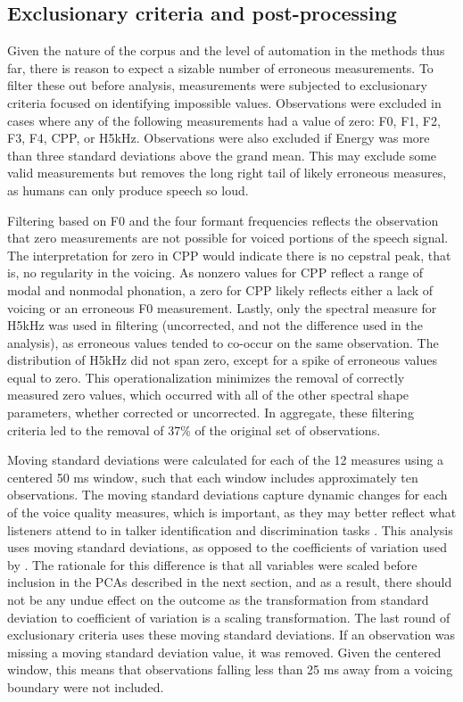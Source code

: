 \subsection{Exclusionary criteria and post-processing}\label{ch3:sec:exclusions}

Given the nature of the corpus and the level of automation in the methods thus far, there is reason to expect a sizable number of erroneous measurements. To filter these out before analysis, measurements were subjected to exclusionary criteria focused on identifying impossible values. Observations were excluded in cases where any of the following measurements had a value of zero: F0, F1, F2, F3, F4, CPP, or H5kHz. Observations were also excluded if Energy was more than three standard deviations above the grand mean. This may exclude some valid measurements but removes the long right tail of likely erroneous measures, as humans can only produce speech so loud. 

Filtering based on F0 and the four formant frequencies reflects the observation that zero measurements are not possible for voiced portions of the speech signal. The interpretation for zero in CPP would indicate there is no cepstral peak, that is, no regularity in the voicing. As nonzero values for CPP reflect a range of modal and nonmodal phonation, a zero for CPP likely reflects either a lack of voicing or an erroneous F0 measurement. Lastly, only the spectral measure for H5kHz was used in filtering (uncorrected, and not the difference used in the analysis), as erroneous values tended to co-occur on the same observation. The distribution of H5kHz did not span zero, except for a spike of erroneous values equal to zero. This operationalization minimizes the removal of correctly measured zero values, which occurred with all of the other spectral shape parameters, whether corrected or uncorrected. In aggregate, these filtering criteria led to the removal of 37\% of the original set of observations.

Moving standard deviations were calculated for each of the 12 measures using a centered 50 ms window, such that each window includes approximately ten observations. The moving standard deviations capture dynamic changes for each of the voice quality measures, which is important, as they may better reflect what listeners attend to in talker identification and discrimination tasks \citep{lee_2019_acoustic}. This analysis uses moving standard deviations, as opposed to the coefficients of variation used by \citet{lee_2019_acoustic}. The rationale for this difference is that all variables were scaled before inclusion in the PCAs described in the next section, and as a result, there should not be any undue effect on the outcome as the transformation from standard deviation to coefficient of variation is a scaling transformation. The last round of exclusionary criteria uses these moving standard deviations. If an observation was missing a moving standard deviation value, it was removed. Given the centered window, this means that observations falling less than 25 ms away from a voicing boundary were not included. 

